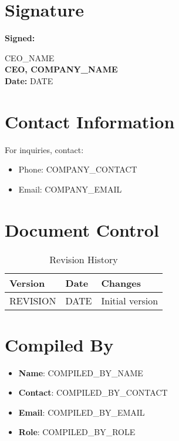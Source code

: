 \documentclass[12pt]{article}
\begin{document}
\section{Signature}
\textbf{Signed:}

{{CEO_NAME}}\\
\textbf{CEO, {{COMPANY_NAME}}}\\
\textbf{Date:} {{DATE}}

\section{Contact Information}
For inquiries, contact:
\begin{itemize}
    \item Phone: {{COMPANY_CONTACT}}
    \item Email: {{COMPANY_EMAIL}}
\end{itemize}

\section{Document Control}
\begin{table}[h]
    \centering
    \begin{tabular}{p{3cm}p{3cm}p{6cm}}
        \toprule
        \textbf{Version} & \textbf{Date} & \textbf{Changes} \\
        \midrule
        {{REVISION}} & {{DATE}} & Initial version \\
        \bottomrule
    \end{tabular}
    \caption{Revision History}
\end{table}

\section{Compiled By}
\begin{itemize}
    \item \textbf{Name}: {{COMPILED_BY_NAME}}
    \item \textbf{Contact}: {{COMPILED_BY_CONTACT}}
    \item \textbf{Email}: {{COMPILED_BY_EMAIL}}
    \item \textbf{Role}: {{COMPILED_BY_ROLE}}
\end{itemize}
\end{document}
